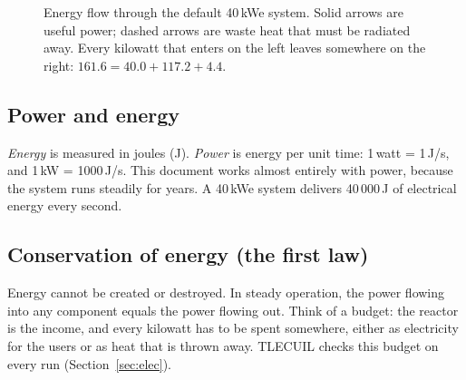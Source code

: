 \documentclass[11pt]{article}
\numberwithin{equation}{section}
\numberwithin{table}{section}
\begin{document}
\begin{figure}[ht]
\centering
{}
\caption{Energy flow through the default 40\,kWe system. Solid arrows are useful power;
dashed arrows are waste heat that must be radiated away. Every kilowatt that enters on
the left leaves somewhere on the right: $161.6 = 40.0 + 117.2 + 4.4$.}
\label{fig:block}
\end{figure}

\subsection{Power and energy}
\emph{Energy} is measured in joules (J). \emph{Power} is energy per unit time:
1\,watt = 1\,J/s, and 1\,kW = 1000\,J/s. This document works almost entirely with power,
because the system runs steadily for years. A 40\,kWe system delivers 40\,000\,J of
electrical energy every second.

\subsection{Conservation of energy (the first law)}
Energy cannot be created or destroyed. In steady operation, the power flowing into any
component equals the power flowing out. Think of a budget: the reactor is the income, and
every kilowatt has to be spent somewhere, either as electricity for the users or as heat
that is thrown away. TLECUIL checks this budget on every run (Section~\ref{sec:elec}).
\end{document}
